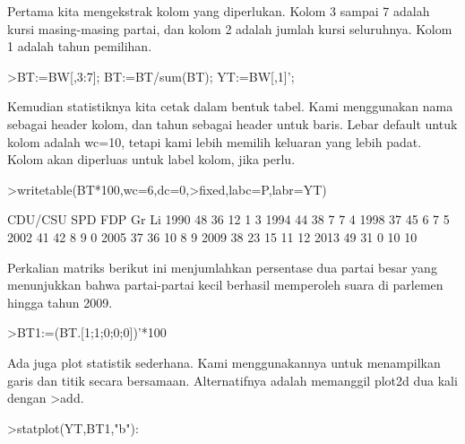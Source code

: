 \documentclass{article}
\begin{document}
\begin{eulernotebook}
\begin{eulercomment}
\begin{eulercomment}
\begin{eulercomment}
Pertama kita mengekstrak kolom yang diperlukan. Kolom 3 sampai 7
adalah kursi masing-masing partai, dan kolom 2 adalah jumlah kursi
seluruhnya. Kolom 1 adalah tahun pemilihan.
\end{eulercomment}
\begin{eulerprompt}
>BT:=BW[,3:7]; BT:=BT/sum(BT); YT:=BW[,1]';
\end{eulerprompt}
\begin{eulercomment}
Kemudian statistiknya kita cetak dalam bentuk tabel. Kami menggunakan
nama sebagai header kolom, dan tahun sebagai header untuk baris. Lebar
default untuk kolom adalah wc=10, tetapi kami lebih memilih keluaran
yang lebih padat. Kolom akan diperluas untuk label kolom, jika perlu.
\end{eulercomment}
\begin{eulerprompt}
>writetable(BT*100,wc=6,dc=0,>fixed,labc=P,labr=YT)
\end{eulerprompt}
\begin{euleroutput}
         CDU/CSU   SPD   FDP    Gr    Li
    1990      48    36    12     1     3
    1994      44    38     7     7     4
    1998      37    45     6     7     5
    2002      41    42     8     9     0
    2005      37    36    10     8     9
    2009      38    23    15    11    12
    2013      49    31     0    10    10
\end{euleroutput}
\begin{eulercomment}
Perkalian matriks berikut ini menjumlahkan persentase dua partai besar
yang menunjukkan bahwa partai-partai kecil berhasil memperoleh suara
di parlemen hingga tahun 2009.
\end{eulercomment}
\begin{eulerprompt}
>BT1:=(BT.[1;1;0;0;0])'*100
\end{eulerprompt}
\begin{euleroutput}
  [84.29,  81.25,  81.1659,  82.7529,  72.9642,  61.8971,  79.8732]
\end{euleroutput}
\begin{eulercomment}
Ada juga plot statistik sederhana. Kami menggunakannya untuk
menampilkan garis dan titik secara bersamaan. Alternatifnya adalah
memanggil plot2d dua kali dengan \textgreater{}add.
\end{eulercomment}
\begin{eulerprompt}
>statplot(YT,BT1,"b"):
\end{eulerprompt}
\begin{eulercomment}

\end{eulercomment}
\end{eulercomment}
\end{eulercomment}
\end{eulernotebook}
\end{document}

